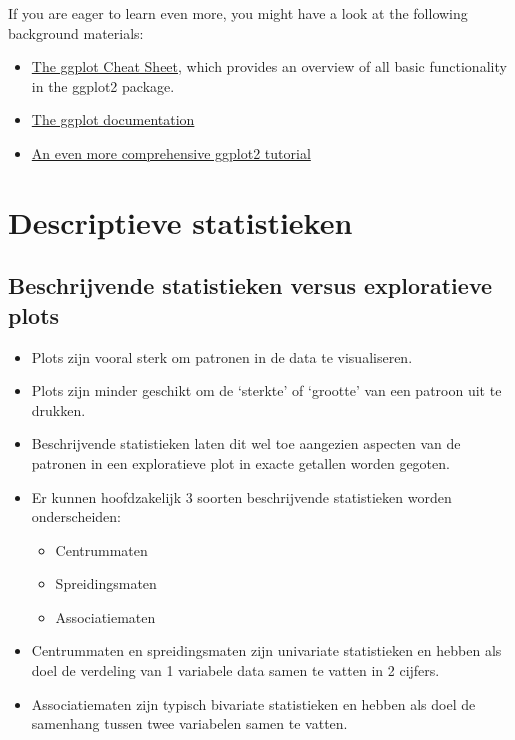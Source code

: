 \documentclass[]{tufte-book}
\providecommand{\tightlist}{%
  \setlength{\itemsep}{0pt}\setlength{\parskip}{0pt}}
\begin{document}
If you are eager to learn even more, you might have a look at the following background materials:

\begin{itemize}
\tightlist
\item
  \href{https://www.rstudio.com/wp-content/uploads/2015/03/ggplot2-cheatsheet.pdf}{The ggplot Cheat Sheet}, which provides an overview of all basic functionality in the ggplot2 package.
\item
  \href{http://docs.ggplot2.org/current/}{The ggplot documentation}
\item
  \href{http://tutorials.iq.harvard.edu/R/Rgraphics/Rgraphics.html}{An even more comprehensive ggplot2 tutorial}
\end{itemize}

\hypertarget{descriptieve-statistieken}{%
\chapter{Descriptieve statistieken}\label{descriptieve-statistieken}}

\hypertarget{beschrijvende-statistieken-versus-exploratieve-plots}{%
\section{Beschrijvende statistieken versus exploratieve plots}\label{beschrijvende-statistieken-versus-exploratieve-plots}}

\begin{itemize}
\tightlist
\item
  Plots zijn vooral sterk om patronen in de data te visualiseren.
\item
  Plots zijn minder geschikt om de `sterkte' of `grootte' van een patroon uit te drukken.
\item
  Beschrijvende statistieken laten dit wel toe aangezien aspecten van de patronen in een exploratieve plot in exacte getallen worden gegoten.
\item
  Er kunnen hoofdzakelijk 3 soorten beschrijvende statistieken worden onderscheiden:

  \begin{itemize}
  \tightlist
  \item
    Centrummaten
  \item
    Spreidingsmaten
  \item
    Associatiematen
  \end{itemize}
\item
  Centrummaten en spreidingsmaten zijn univariate statistieken en hebben als doel de verdeling van 1 variabele data samen te vatten in 2 cijfers.
\item
  Associatiematen zijn typisch bivariate statistieken en hebben als doel de samenhang tussen twee variabelen samen te vatten.
\end{itemize}
\end{document}
